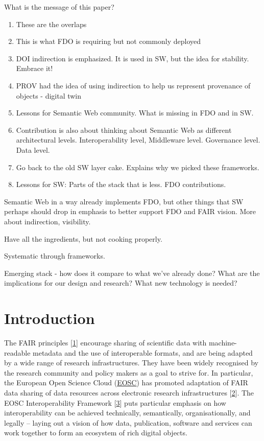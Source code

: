 What is the message of this paper?

\begin{enumerate}
\def\labelenumi{\arabic{enumi}.}
\tightlist
\item
  These are the overlaps
\item
  This is what FDO is requiring but not commonly deployed
\item
  DOI indirection is emphasized. It is used in SW, but the idea for stability. Embrace it!
\item
  PROV had the idea of using indirection to help us represent provenance of objects - digital twin
\item
  Lessons for Semantic Web community. What is missing in FDO and in SW.
\item
  Contribution is also about thinking about Semantic Web as different architectural levels. Interoperability level, Middleware level. Governance level. Data level.
\item
  Go back to the old SW layer cake. Explains why we picked these frameworks.
\item
  Lessons for SW: Parts of the stack that is less. FDO contributions.
\end{enumerate}

Semantic Web in a way already implements FDO, but other things that SW perhaps should drop in emphasis to better support FDO and FAIR vision. More about indirection, visibility.

Have all the ingredients, but not cooking properly.

Systematic through frameworks.

Emerging stack - how does it compare to what we've already done? What are the implications for our design and research? What new technology is needed?

\hypertarget{sec:introduction}{%
\section{Introduction}\label{sec:introduction}}

The FAIR principles {[}\protect\hyperlink{ref-6DjakjNS}{1}{]} encourage sharing of scientific data with machine-readable metadata and the use of interoperable formats, and are being adapted by a wide range of research infrastructures. They have been widely recognised by the research community and policy makers as a goal to strive for. In particular, the European Open Science Cloud (\href{https://www.eosc.eu/}{EOSC}) has promoted adaptation of FAIR data sharing of data resources across electronic research infrastructures {[}\protect\hyperlink{ref-u8Cy0psL}{2}{]}. The EOSC Interoperability Framework {[}\protect\hyperlink{ref-aCye3KpE}{3}{]} puts particular emphasis on how interoperability can be achieved technically, semantically, organisationally, and legally -- laying out a vision of how data, publication, software and services can work together to form an ecosystem of rich digital objects.

